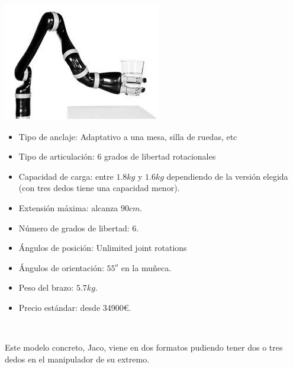 	  \begin{minipage}{0.35\textwidth}
	  	\includegraphics[width=\linewidth]{figuras/Imagenes_EstadoArte/jaco-3-finger.jpg}
	  \end{minipage}
	  \begin{minipage}{0.65\textwidth}\raggedright
	  	\hspace{1cm}
	  	\begin{itemize}
	  		\item Tipo de anclaje: Adaptativo a una mesa, silla de ruedas, etc
	  		\item Tipo de articulación: 6 grados de libertad rotacionales
	  		\item Capacidad de carga: entre $1.8kg$ y $1.6kg$ dependiendo de la versión elegida (con tres dedos tiene una capacidad menor).
	  		\item Extensión máxima: alcanza $90cm$.
	  		\item Número de grados de libertad: 6.
	  		\item Ángulos de posición: Unlimited joint rotations 
	  		\item Ángulos de orientación: $55^o$ en la muñeca.
	  		\item Peso del brazo: $5.7kg$.
	  		\item Precio estándar: desde 34900\euro.
	  	\end{itemize}
	  \end{minipage}
	  \\

	  \vspace{0.1cm}

      Este modelo concreto, Jaco, viene en dos formatos pudiendo tener dos o tres dedos en el manipulador de su extremo.
      \\

